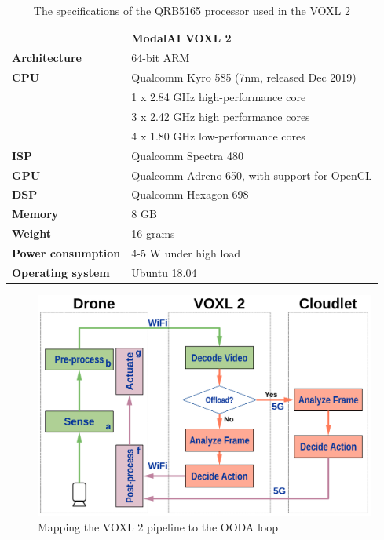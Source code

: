 \begin{table}[htbp]
    \centering
    \begin{tabular}{@{}ll@{}}
        \toprule
        \textbf{} & \textbf{ModalAI VOXL 2}\\
        \midrule
        \textbf{Architecture} & 64-bit ARM\\
        \textbf{CPU} & Qualcomm Kyro 585 (7nm, released Dec 2019)\\
                     & 1 x 2.84 GHz high-performance core\\
                     & 3 x 2.42 GHz high performance cores\\
                     & 4 x 1.80 GHz low-performance cores\\
        \textbf{ISP} & Qualcomm Spectra 480\\
        \textbf{GPU} & Qualcomm Adreno 650, with support for OpenCL\\
        \textbf{DSP} & Qualcomm Hexagon 698\\
        \textbf{Memory} & 8 GB\\
        \textbf{Weight} & 16 grams\\
        \textbf{Power consumption} & 4-5 W under high load\\
        \textbf{Operating system} & Ubuntu 18.04\\
        \bottomrule
    \end{tabular}
    \caption{The specifications of the QRB5165 processor used in the VOXL 2}
    \label{tab:voxl2-specs}
\end{table}

\begin{figure}[htbp]
\centering
\includegraphics[width = .7\textwidth]{figs/fig-voxl-ooda-loop-crop.pdf}
\caption{Mapping the VOXL 2 pipeline to the OODA loop}
\label{fig:voxl2-ooda-loop-mapping}
\end{figure}

